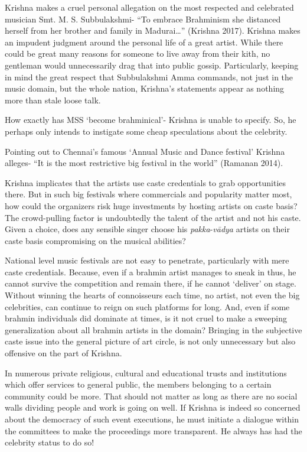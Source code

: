 Krishna makes a cruel personal allegation on the most respected and celebrated musician Smt. M. S. Subbulakshmi- “To embrace Brahminism she distanced herself from her brother and family in Madurai…” (Krishna 2017). Krishna makes an impudent judgment around the personal life of a great artist. While there could be great many reasons for someone to live away from their kith, no gentleman would unnecessarily drag that into public gossip. Particularly, keeping in mind the great respect that Subbulakshmi Amma commands, not just in the music domain, but the whole nation, Krishna’s statements appear as nothing more than stale loose talk.

How exactly has MSS ‘become brahminical’- Krishna is unable to specify. So, he perhaps only intends to instigate some cheap speculations about the celebrity.

Pointing out to Chennai’s famous ‘Annual Music and Dance festival’ Krishna alleges- “It is the most restrictive big festival in the world” (Ramanan 2014).

Krishna implicates that the artists use caste credentials to grab opportunities there. But in such big festivals where commercials and popularity matter most, how could the organizers risk huge investments by hosting artists on caste basis? The crowd-pulling factor is undoubtedly the talent of the artist and not his caste. Given a choice, does any sensible singer choose his \textit{pakka}-\textit{vādya} artists on their caste basis compromising on the musical abilities?

National level music festivals are not easy to penetrate, particularly with mere caste credentials. Because, even if a brahmin artist manages to sneak in thus, he cannot survive the competition and remain there, if he cannot ‘deliver’ on stage. Without winning the hearts of connoisseurs each time, no artist, not even the big celebrities, can continue to reign on such platforms for long. And, even if some brahmin individuals did dominate at times, is it not cruel to make a sweeping generalization about all brahmin artists in the domain? Bringing in the subjective caste issue into the general picture of art circle, is not only unnecessary but also offensive on the part of Krishna.

In numerous private religious, cultural and educational trusts and institutions which offer services to general public, the members belonging to a certain community could be more. That should not matter as long as there are no social walls dividing people and work is going on well. If Krishna is indeed so concerned about the democracy of such event executions, he must initiate a dialogue within the committees to make the proceedings more transparent. He always has had the celebrity status to do so!

